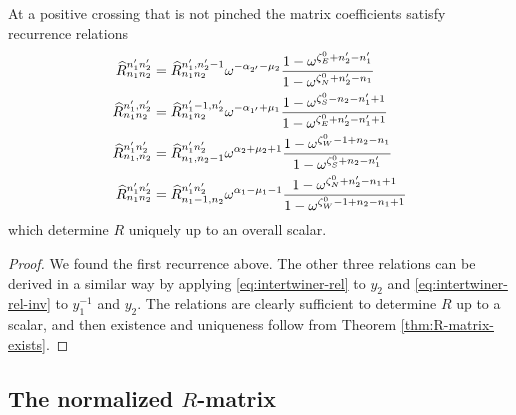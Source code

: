 \documentclass{sl2ams}
\numberwithin{equation}{section}
\begin{document}
\begin{theorem}
  \label{thm:R-recurrences}
  At a positive crossing that is not pinched the matrix coefficients satisfy recurrence relations
  \begin{align}
    \label{eq:R-recurrence-i}
    \rmat{n_1}{n_2}{n_1'}{n_2' }
    &=
    \rmat{n_1}{n_2}{n_1',}{n_2' -1}
    {\omega^{-\alpha_{2'} - \mu_2} }
    \frac
    {1 - \omega^{\zeta_E^0 + n_2' - n_1'}}
    {1 - \omega^{\zeta_N^0 +  n_2' - n_1}} 
    \\
    \label{eq:R-recurrence-ii}
    \rmat{n_1}{n_2}{n_1',}{n_2'}
    &=
    \rmat{n_1}{n_2}{n_1'-1,}{n_2'}
    \omega^{-\alpha_{1'} + \mu_1}
    \frac
    {1 - \omega^{\zeta_S^0 - n_2 - n_1' + 1} }
    {1 - \omega^{\zeta_E^0 + n_2' - n_1' + 1 } }
    \\
    \label{eq:R-recurrence-iii}
    \rmat{n_1,}{n_2}{n_1'}{n_2'}
    &=
    \rmat{n_1,}{n_2 -1}{n_1'}{n_2'}
    \omega^{\alpha_2 + \mu_2 + 1}
    \frac
    {1 - \omega^{\zeta_W^0 - 1 + n_2 - n_1} }
    {1 -  \omega^{\zeta_S^0 + n_2 - n_1'}}
    \\ 
    \label{eq:R-recurrence-iv}
    \rmat{n_1}{n_2}{n_1'}{n_2'}
    &=
    \rmat{n_1 - 1,}{n_2}{n_1'}{n_2'}
    \omega^{\alpha_{1} - \mu_1 - 1}
    \frac
    {1 - \omega^{\zeta_N^0 + n_2' - n_1 +1 }}
    {1 -  \omega^{\zeta_W^0 - 1 + n_2 - n_1 +1} } 
  \end{align}
  which determine $R$ uniquely up to an overall scalar.
\end{theorem}
\begin{proof}
  We found the first recurrence above.
  The other three relations can be derived in a similar way by applying \ref{eq:intertwiner-rel} to $y_2$ and \ref{eq:intertwiner-rel-inv} to  $y_1^{-1}$ and $y_2$.
  The relations are clearly sufficient to determine $R$ up to a scalar, and then existence and uniqueness follow from Theorem \ref{thm:R-matrix-exists}.
\end{proof}

\subsection{The normalized \texorpdfstring{\(R\)}{R}-matrix}
\end{document}
